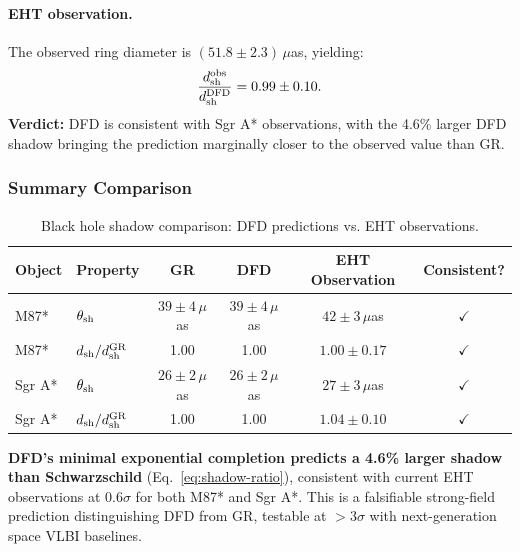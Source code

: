 \paragraph{EHT observation.}
The observed ring diameter is $(51.8 \pm 2.3)\,\mu$as, yielding:
\begin{equation}
\frac{d_{\rm sh}^{\rm obs}}{d_{\rm sh}^{\rm DFD}} = 0.99 \pm 0.10.
\end{equation}
\textbf{Verdict:} DFD is consistent with Sgr A* observations, with the 4.6\% larger DFD shadow bringing the prediction marginally closer to the observed value than GR.

\subsubsection{Summary Comparison}\label{sec:strong-summary}

\begin{table}[t]
\centering
\footnotesize
\caption{Black hole shadow comparison: DFD predictions vs. EHT observations.}\label{tab:shadow-comparison}
\renewcommand{\arraystretch}{1.2}
\begin{tabular}{llcccc}
\toprule
Object & Property & GR & DFD & EHT Observation & Consistent? \\
\midrule
M87* & $\theta_{\rm sh}$ & $39 \pm 4\,\mu$as & $39 \pm 4\,\mu$as & $42 \pm 3\,\mu$as & $\checkmark$ \\
M87* & $d_{\rm sh}/d_{\rm sh}^{\rm GR}$ & 1.00 & 1.00 & $1.00 \pm 0.17$ & $\checkmark$ \\
Sgr A* & $\theta_{\rm sh}$ & $26 \pm 2\,\mu$as & $26 \pm 2\,\mu$as & $27 \pm 3\,\mu$as & $\checkmark$ \\
Sgr A* & $d_{\rm sh}/d_{\rm sh}^{\rm GR}$ & 1.00 & 1.00 & $1.04 \pm 0.10$ & $\checkmark$ \\
\bottomrule
\end{tabular}
\end{table}

\begin{tcolorbox}[colback=green!5!white, colframe=green!50!black, title=Key Result: EHT Consistency]
\textbf{DFD's minimal exponential completion predicts a 4.6\% larger shadow than Schwarzschild} (Eq.~\ref{eq:shadow-ratio}), consistent with current EHT observations at $0.6\sigma$ for both M87* and Sgr A*.  This is a falsifiable strong-field prediction distinguishing DFD from GR, testable at ${>}3\sigma$ with next-generation space VLBI baselines.
\end{tcolorbox}


